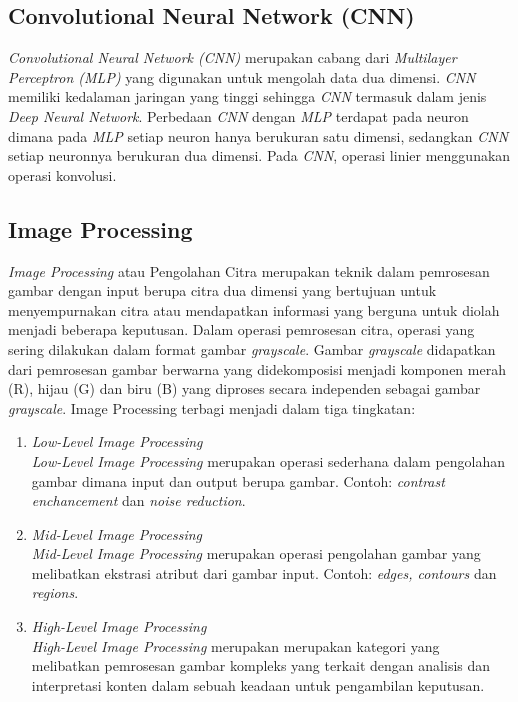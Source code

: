 \subsection{Convolutional Neural Network (CNN)}
\textit{Convolutional Neural Network (CNN)} merupakan cabang dari \textit{Multilayer Perceptron (MLP)} yang digunakan untuk
mengolah data dua dimensi. \textit{CNN} memiliki kedalaman jaringan yang tinggi sehingga \textit{CNN} termasuk dalam jenis
\textit{Deep Neural Network}. Perbedaan \textit{CNN} dengan \textit{MLP} terdapat pada neuron dimana pada \textit{MLP} setiap neuron hanya
berukuran satu dimensi, sedangkan \textit{CNN} setiap neuronnya berukuran dua dimensi. Pada \textit{CNN}, operasi linier
menggunakan operasi konvolusi\citep{CNN}.

\subsection{Image Processing}
\textit{Image Processing} atau Pengolahan Citra merupakan teknik dalam pemrosesan gambar dengan input berupa 
citra dua dimensi yang bertujuan untuk menyempurnakan citra atau mendapatkan informasi yang berguna 
untuk diolah menjadi beberapa keputusan. Dalam operasi pemrosesan citra, operasi yang sering dilakukan 
dalam format gambar \textit{grayscale}. Gambar \textit{grayscale} didapatkan dari pemrosesan gambar berwarna yang 
didekomposisi menjadi komponen merah (R), hijau (G) dan biru (B) yang diproses secara independen sebagai 
gambar \textit{grayscale}. Image Processing terbagi menjadi dalam tiga tingkatan\citep{ImageProcesing}:
    \begin{enumerate}
        \item \textit{Low-Level Image Processing} \\
        \textit{Low-Level Image Processing} merupakan operasi sederhana dalam pengolahan gambar dimana input dan 
        output berupa gambar. Contoh: \textit{contrast enchancement} dan \textit{noise reduction}.
        \item \textit{Mid-Level Image Processing} \\
        \textit{Mid-Level Image Processing} merupakan operasi pengolahan gambar yang melibatkan ekstrasi atribut dari 
        gambar input. Contoh: \textit{edges, contours} dan \textit{regions}.
        \item \textit{High-Level Image Processing} \\
        \textit{High-Level Image Processing} merupakan merupakan kategori yang melibatkan pemrosesan gambar kompleks 
        yang terkait dengan analisis dan interpretasi konten dalam sebuah keadaan untuk pengambilan keputusan.
    \end{enumerate}

